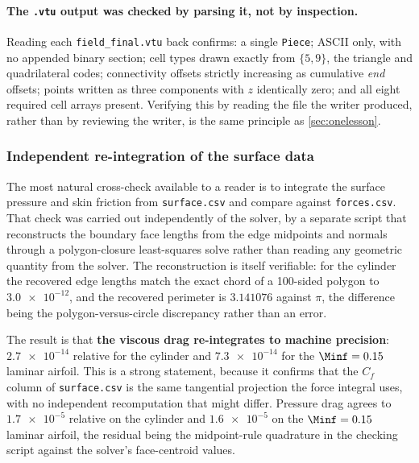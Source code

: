 \paragraph{The \texttt{.vtu} output was checked by parsing it, not by inspection.} Reading
each \texttt{field\_final.vtu} back confirms: a single \texttt{Piece}; ASCII only, with no
appended binary section; cell types drawn exactly from $\{5,9\}$, the triangle and
quadrilateral codes; connectivity offsets strictly increasing as cumulative \emph{end}
offsets; points written as three components with $z$ identically zero; and all eight required
cell arrays present. Verifying this by reading the file the writer produced, rather than by
reviewing the writer, is the same principle as \cref{sec:onelesson}.

\subsubsection{Independent re-integration of the surface data}
\label{sec:reintegrate}

The most natural cross-check available to a reader is to integrate the surface
pressure and skin friction from \texttt{surface.csv} and compare against
\texttt{forces.csv}. That check was carried out independently of the solver, by a
separate script that reconstructs the boundary face lengths from the edge midpoints
and normals through a polygon-closure least-squares solve rather than reading any
geometric quantity from the solver. The reconstruction is itself verifiable: for the
cylinder the recovered edge lengths match the exact chord of a 100-sided polygon to
$\num{3.0e-12}$, and the recovered perimeter is $3.141076$ against $\pi$, the
difference being the polygon-versus-circle discrepancy rather than an error.

The result is that \textbf{the viscous drag re-integrates to machine precision}:
$\num{2.7e-14}$ relative for the cylinder and $\num{7.3e-14}$ for the
$\Minf=0.15$ laminar airfoil. This is a strong statement, because it confirms that
the $C_f$ column of \texttt{surface.csv} is the same tangential projection the force
integral uses, with no independent recomputation that might differ. Pressure drag
agrees to $\num{1.7e-5}$ relative on the cylinder and $\num{1.6e-5}$ on the
$\Minf=0.15$ laminar airfoil, the residual being the midpoint-rule quadrature in the
checking script against the solver's face-centroid values.

